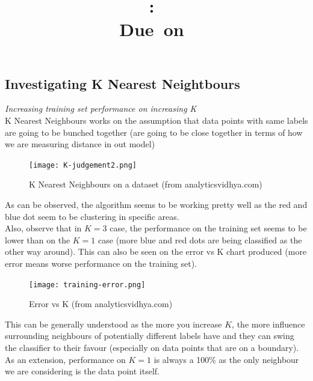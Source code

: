 \documentclass{article}
\title{
\vspace{2in}
\textmd{\textbf{\hmwkClass:\ \hmwkTitle}}\\
\normalsize\vspace{0.1in}\small{Due\ on\ \hmwkDueDate}\\
\vspace{0.1in}
\vspace{3in}
}
\author{\textbf{\hmwkAuthorName}}
\begin{document}
\maketitle
\clearpage


\subsection{Investigating K Nearest Neightbours}
\textit{Increasing training set performance on increasing K}\\

K Nearest Neighbours works on the assumption that data points with same labels are going to be bunched together (are going to be close together in terms of how we are measuring distance in out model)\\

\begin{figure}[h!]
    \centering
    \texttt{[image: K-judgement2.png]}
    \caption{K Nearest Neighbours on a dataset (from analyticsvidhya.com)}
    \label{fig:fig1}
\end{figure}

As can be observed, the algorithm seems to be working pretty well as the red and blue dot seem to be clustering in specific areas.\\

Also, observe that in $K=3$ case, the performance on the training set seems to be lower than on the $K=1$ case (more blue and red dots are being classified as the other way around). This can also be seen on the error vs K chart produced (more error means worse performance on the training set).\\ 

\begin{figure}[h!]
    \centering
    \texttt{[image: training-error.png]}
    \caption{Error vs K (from analyticsvidhya.com)}
    \label{fig:fig2}
\end{figure}

This can be generally understood as the more you increase $K$, the more influence surrounding neighbours of potentially different labels have and they can swing the classifier to their favour (especially on data points that are on a boundary). As an extension, performance on $K=1$ is always a 100\% as the only neighbour we are considering is the data point itself.\\
\end{document}
